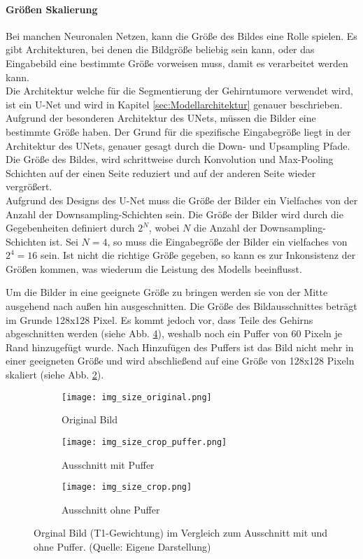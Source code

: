 \paragraph{Größen Skalierung}
\label{paragraph:GrößenSkalierung}
Bei manchen Neuronalen Netzen, kann die Größe des Bildes eine Rolle spielen. Es gibt Architekturen, bei denen die Bildgröße beliebig sein kann, oder das Eingabebild eine bestimmte Größe vorweisen muss, damit es verarbeitet werden kann. \\
Die Architektur welche für die Segmentierung der Gehirntumore verwendet wird, ist ein U-Net und wird in Kapitel \ref{sec:Modellarchitektur} genauer beschrieben. Aufgrund der besonderen Architektur des UNets, müssen die Bilder eine bestimmte Größe haben. Der Grund für die spezifische Eingabegröße liegt in der Architektur des UNets, genauer gesagt durch die Down- und Upsampling Pfade. Die Größe des Bildes, wird schrittweise durch Konvolution und Max-Pooling Schichten auf der einen Seite reduziert und auf der anderen Seite wieder vergrößert. \\
Aufgrund des Designs des U-Net muss die Größe der Bilder ein Vielfaches von der Anzahl der Downsampling-Schichten sein. Die Größe der Bilder wird durch die Gegebenheiten definiert durch $2^N$, wobei $N$ die Anzahl der Downsampling-Schichten ist. Sei $N=4$, so muss die Eingabegröße der Bilder ein vielfaches von $2^4=16$ sein. Ist nicht die richtige Größe gegeben, so kann es zur Inkonsistenz der Größen kommen, was wiederum die Leistung des \gls{Modell}s beeinflusst. \cite[vgl.][]{Ronneberger2015}

Um die Bilder in eine geeignete Größe zu bringen werden sie von der Mitte ausgehend nach außen hin ausgeschnitten. Die Größe des Bildausschnittes beträgt im Grunde 128x128 Pixel. Es kommt jedoch vor, dass Teile des Gehirns abgeschnitten werden (siehe Abb. \ref{fig:GrößeOhnePuffer}), weshalb noch ein Puffer von 60 Pixeln je Rand hinzugefügt wurde. Nach Hinzufügen des Puffers ist das Bild nicht mehr in einer geeigneten Größe und wird abschließend auf eine Größe von 128x128 Pixeln skaliert (siehe Abb. \ref{fig:GrößePuffer}).
\begin{figure}[ht]
	\centering
	\begin{subfigure}[b]{0.4\textwidth}
		\centering
		\texttt{[image: img\_size\_original.png]}
		\caption{Original Bild}
		\label{fig:GrößeOrg}
	\end{subfigure}
\vfil
	\begin{subfigure}[b]{0.4\linewidth}
		\centering
		\texttt{[image: img\_size\_crop\_puffer.png]}
		\caption{Ausschnitt mit Puffer}
		\label{fig:GrößePuffer}
	\end{subfigure}
\hfil
	\begin{subfigure}[b]{0.4\linewidth}
		\centering
		\texttt{[image: img\_size\_crop.png]}
		\caption{Ausschnitt ohne Puffer}
		\label{fig:GrößeOhnePuffer}
	\end{subfigure}
	\caption{Orginal Bild (T1-Gewichtung) im Vergleich zum Ausschnitt mit und ohne Puffer. (Quelle: Eigene Darstellung)}
\end{figure} 


